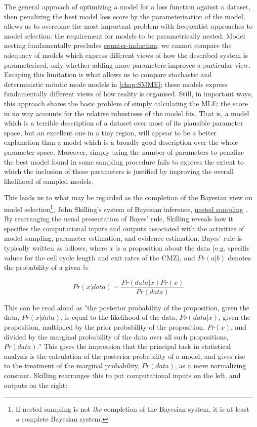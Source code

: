 The general approach of optimizing a model for a loss function against a dataset, then penalizing the best model loss score by the parameterisation of the model, allows us to overcome the most important problem with frequentist approaches to model selection: the requirement for models to be parametrically nested. Model nesting fundamentally precludes \hyperref[sec:Feyerabend]{counter-induction}; we cannot compare the adequacy of models which express different views of how the described system is parameterised, only whether adding more parameters improves a particular view. Escaping this limitation is what allows us to compare stochastic and deterministic mitotic mode models in \autoref{chap:SMME}; these models express fundamentally different views of how reality is organised. Still, in important ways, this approach shares the basic problem of simply calculating the \hyperref[MLE]{MLE}: the score in no way accounts for the relative robustness of the model fits. That is, a model which is a terrible description of a dataset over most of its plausible parameter space, but an excellent one in a tiny region, will appear to be a better explanation than a model which is a broadly good description over the whole parameter space. Moreover, simply using the number of parameters to penalize the best model found in some sampling procedure fails to express the extent to which the inclusion of those parameters is justified by improving the overall likelihood of sampled models.

This leads us to what may be regarded as the completion of the Bayesian view on model selection\footnote{If nested sampling is not \textit{the} completion of the Bayesian system, it is at least \textit{a} complete Bayesian system.}, John Skilling's system of Bayesian inference, \hyperref[ssec:nested]{nested sampling} \cite{Skilling2006,Skilling2012,Skilling2019}. By rearranging the usual presentation of Bayes' rule, Skilling reveals how it specifies the computational inputs and outputs associated with the activities of model sampling, parameter estimation, and evidence estimation. Bayes' rule is typically written as follows, where $x$ is a proposition about the data (e.g. specific values for the cell cycle length and exit rates of the CMZ), and $Pr(a|b)$ denotes the probability of a given b:

\[Pr(x|data) = \frac{Pr(data|x)Pr(x)}{Pr(data)}\]

This can be read aloud as "the posterior probability of the proposition, given the data, $Pr(x|data)$, is equal to the likelihood of the data, $Pr(data|x)$, given the proposition, multiplied by the prior probability of the proposition, $Pr(x)$, and divided by the marginal probability of the data over all such propositions, $Pr(data)$." This gives the impression that the principal task in statistical analysis is the calculation of the posterior probability of a model, and gives rise to the treatment of the marginal probability, $Pr(data)$, as a mere normalizing constant. Skilling rearranges this to put computational inputs on the left, and outputs on the right:


